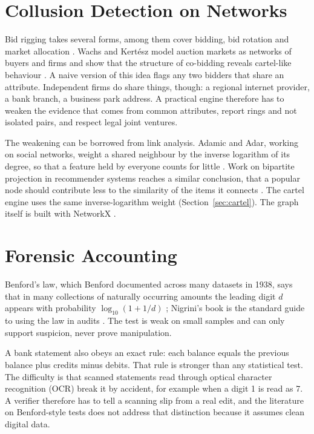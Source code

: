\section{Collusion Detection on Networks}
Bid rigging takes several forms, among them cover bidding, bid rotation and market allocation \cite{dimitri2006handbook}. Wachs and Kert\'esz model auction markets as networks of buyers and firms and show that the structure of co-bidding reveals cartel-like behaviour \cite{wachs2019network}. A naive version of this idea flags any two bidders that share an attribute. Independent firms do share things, though: a regional internet provider, a bank branch, a business park address. A practical engine therefore has to weaken the evidence that comes from common attributes, report rings and not isolated pairs, and respect legal joint ventures.

The weakening can be borrowed from link analysis. Adamic and Adar, working on social networks, weight a shared neighbour by the inverse logarithm of its degree, so that a feature held by everyone counts for little \cite{adamic2003friends}. Work on bipartite projection in recommender systems reaches a similar conclusion, that a popular node should contribute less to the similarity of the items it connects \cite{zhou2007bipartite}. The cartel engine uses the same inverse-logarithm weight (Section~\ref{sec:cartel}). The graph itself is built with NetworkX \cite{hagberg2008networkx}.

\section{Forensic Accounting}
Benford's law, which Benford documented across many datasets in 1938, says that in many collections of naturally occurring amounts the leading digit $d$ appears with probability $\log_{10}(1+1/d)$ \cite{benford1938law}; Nigrini's book is the standard guide to using the law in audits \cite{nigrini2012benford}. The test is weak on small samples and can only support suspicion, never prove manipulation.

A bank statement also obeys an exact rule: each balance equals the previous balance plus credits minus debits. That rule is stronger than any statistical test. The difficulty is that scanned statements read through optical character recognition (OCR) break it by accident, for example when a digit 1 is read as 7. A verifier therefore has to tell a scanning slip from a real edit, and the literature on Benford-style tests does not address that distinction because it assumes clean digital data.

